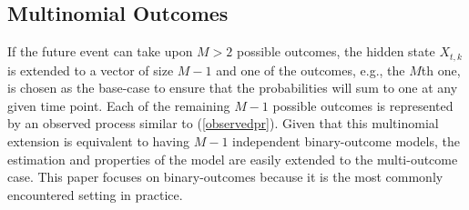 \documentclass[aoas, preprint]{imsart}
\newcommand{\argmax}{\operatornamewithlimits{arg\ max}}
\numberwithin{equation}{section}
\theoremstyle{plain}
\newcommand{\R}{\mathbb{R}}
\renewcommand{\P}{\mathbb{P}}
\newcommand{\logit}{\text{logit}}
\begin{document}
\subsection{Multinomial Outcomes}

If the future event can take upon $M > 2$ possible outcomes, the hidden state $X_{t,k}$ is extended to a vector of size $M-1$ and one of the outcomes, e.g., the $M$th one, is chosen as the base-case to ensure that the probabilities will sum to one at any given time point. Each of the remaining  $M-1$ possible outcomes is represented by an observed process similar to  (\ref{observedpr}). Given that this multinomial extension is equivalent to having $M-1$ independent binary-outcome models, the estimation and properties of the model are easily extended to the multi-outcome case. This paper focuses on binary-outcomes because it is the most commonly encountered setting in practice. 
\end{document}

